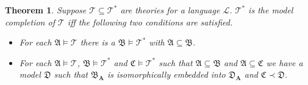 \documentclass[titlepage, oneside]{amsbook}
\theoremstyle{plain}
\newtheorem{theorem}{Theorem}
\theoremstyle{definition}
\theoremstyle{remark}
\newcommand{\theory}{\ensuremath{\mathcal{T}}}
\newcommand{\tstar}{\ensuremath{\mathcal{T}^{\ast}}}
\newcommand{\lan}{\ensuremath{\mathcal{L}}}
\newcommand{\seq}{\ensuremath{\subseteq}}
\newcommand{\ma}{\ensuremath{\mathfrak{A}}}
\newcommand{\mb}{\ensuremath{\mathfrak{B}}}
\newcommand{\mc}{\ensuremath{\mathfrak{C}}}
\newcommand{\md}{\ensuremath{\mathfrak{D}}}
\newcommand{\ba}{\ensuremath{\mathbf{A}}}
\begin{document}
\begin{theorem}\label{T:modcomp} Suppose $\theory \seq \tstar$ are theories for
a language $\lan$. $\theory^{\ast}$ is the model completion of $\theory$ iff the following two conditions are satisfied.
\begin{itemize}
\item[(1)] For each $\ma \models \theory$ 
there is a $\mb \models \tstar$ with $\ma \seq \mb$.
\item[(2)]  For each $\ma \models \theory$, $\mb \models \theory^{\ast}$
and $\mc \models \tstar$ such that $\ma \seq \mb$ and $\ma \seq \mc$ we
have a model $\md$ such that $\mb_\ba$ is isomorphically embedded into $\md_\ba$
and $\mc \prec \md$. 
\end{itemize}
\end{theorem}
\end{document}
